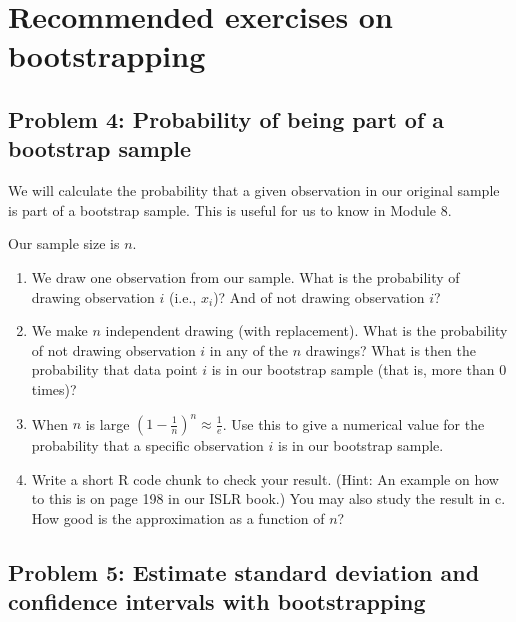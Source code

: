 \documentclass[]{article}
\providecommand{\tightlist}{%
  \setlength{\itemsep}{0pt}\setlength{\parskip}{0pt}}
\begin{document}
\hypertarget{recommended-exercises-on-bootstrapping}{%
\section{Recommended exercises on
bootstrapping}\label{recommended-exercises-on-bootstrapping}}

\hypertarget{problem-4-probability-of-being-part-of-a-bootstrap-sample}{%
\subsection{Problem 4: Probability of being part of a bootstrap
sample}\label{problem-4-probability-of-being-part-of-a-bootstrap-sample}}

We will calculate the probability that a given observation in our
original sample is part of a bootstrap sample. This is useful for us to
know in Module 8.

Our sample size is \(n\).

\begin{enumerate}
\def\labelenumi{\alph{enumi}.}
\tightlist
\item
  We draw one observation from our sample. What is the probability of
  drawing observation \(i\) (i.e., \(x_i\))? And of not drawing
  observation \(i\)?
\item
  We make \(n\) independent drawing (with replacement). What is the
  probability of not drawing observation \(i\) in any of the \(n\)
  drawings? What is then the probability that data point \(i\) is in our
  bootstrap sample (that is, more than 0 times)?
\item
  When \(n\) is large \((1-\frac{1}{n})^n \approx \frac{1}{e}\). Use
  this to give a numerical value for the probability that a specific
  observation \(i\) is in our bootstrap sample.
\item
  Write a short R code chunk to check your result. (Hint: An example on
  how to this is on page 198 in our ISLR book.) You may also study the
  result in c. How good is the approximation as a function of \(n\)?
\end{enumerate}

\hypertarget{problem-5-estimate-standard-deviation-and-confidence-intervals-with-bootstrapping}{%
\subsection{Problem 5: Estimate standard deviation and confidence
intervals with
bootstrapping}\label{problem-5-estimate-standard-deviation-and-confidence-intervals-with-bootstrapping}}
\end{document}
